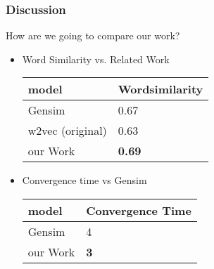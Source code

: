 \begin{frame}
\frametitle{Discussion}
How are we going to compare our work? 
\begin{itemize}

\item Word Similarity vs. Related Work
\begin{table}[]
\begin{tabular}{|l|l|}
\hline
model         & Wordsimilarity \\ \hline
Gensim           & 0.67           \\ \hline
w2vec (original) & 0.63           \\ \hline
our Work         & \textbf{0.69}       \\ \hline
\end{tabular}
\end{table}
\item Convergence time vs Gensim
\begin{table}[]
\begin{tabular}{|l|l|}
\hline
model         & Convergence Time \\ \hline
Gensim           & 4          \\ \hline
our Work & \textbf{3}           \\ \hline
\end{tabular}
\end{table}
\end{itemize}


\end{frame}
